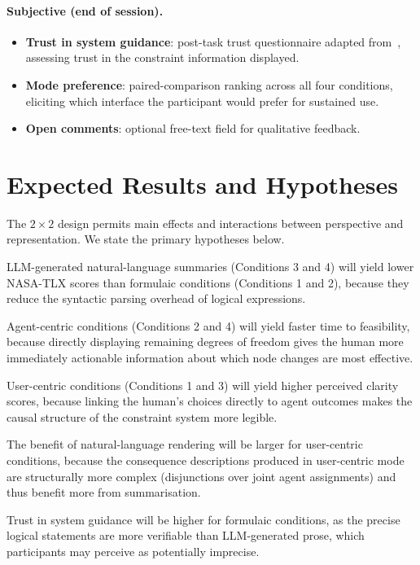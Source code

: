 \documentclass[10pt]{article}
\theoremstyle{definition}
\begin{document}
\paragraph{Subjective (end of session).}
\begin{itemize}
  \item \textbf{Trust in system guidance}: post-task trust questionnaire adapted
        from~\citep{jian2000foundations}, assessing trust in the constraint information displayed.
  \item \textbf{Mode preference}: paired-comparison ranking across all four conditions, eliciting
        which interface the participant would prefer for sustained use.
  \item \textbf{Open comments}: optional free-text field for qualitative feedback.
\end{itemize}

\section{Expected Results and Hypotheses}
\label{sec:results}

The $2 \times 2$ design permits main effects and interactions between perspective and representation.
We state the primary hypotheses below.

\begin{description}[leftmargin=2em]
  \item[H1 \emph{(Representation -- Workload)}]
    LLM-generated natural-language summaries (Conditions 3 and 4) will yield lower NASA-TLX
    scores than formulaic conditions (Conditions 1 and 2), because they reduce the syntactic
    parsing overhead of logical expressions.
  \item[H2 \emph{(Perspective -- Convergence)}]
    Agent-centric conditions (Conditions 2 and 4) will yield faster time to feasibility, because
    directly displaying remaining degrees of freedom gives the human more immediately actionable
    information about which node changes are most effective.
  \item[H3 \emph{(Perspective -- Understanding)}]
    User-centric conditions (Conditions 1 and 3) will yield higher perceived clarity scores,
    because linking the human's choices directly to agent outcomes makes the causal structure of
    the constraint system more legible.
  \item[H4 \emph{(Interaction)}]
    The benefit of natural-language rendering will be larger for user-centric conditions, because
    the consequence descriptions produced in user-centric mode are structurally more complex
    (disjunctions over joint agent assignments) and thus benefit more from summarisation.
  \item[H5 \emph{(Trust)}]
    Trust in system guidance will be higher for formulaic conditions, as the precise logical
    statements are more verifiable than LLM-generated prose, which participants may perceive as
    potentially imprecise.
\end{description}
\end{document}
